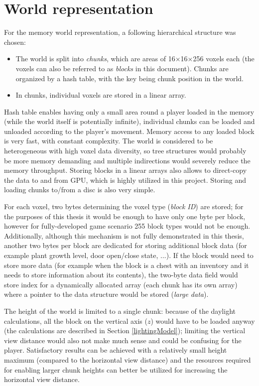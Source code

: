 \section{World representation} \label{worldRepresentationDesign}
For the memory world representation, a following hierarchical structure was chosen:
\begin{itemize}
	\item The world is split into \textit{chunks}, which are areas of 16×16×256 voxels each (the voxels can also be referred to as \textit{blocks} in this document). Chunks are organized by a hash table, with the key being chunk position in the world.
	\item In chunks, individual voxels are stored in a linear array.
\end{itemize}

Hash table enables having only a small area round a player loaded in the memory (while the world itself is potentially infinite), individual chunks can be loaded and unloaded according to the player's movement. Memory access to any loaded block is very fast, with constant complexity. The world is considered to be heterogeneous with high voxel data diversity, so tree structures would probably be more memory demanding and multiple indirections would severely reduce the memory throughput. Storing blocks in a linear arrays also allows to direct-copy the data to and from GPU, which is highly utilized in this project. Storing and loading chunks to/from a disc is also very simple.

For each voxel, two bytes determining the voxel type (\textit{block ID}) are stored; for the purposes of this thesis it would be enough to have only one byte per block, however for fully-developed game scenario 255 block types would not be enough. Additionally, although this mechanism is not fully demonstrated in this thesis, another two bytes per block are dedicated for storing additional block data (for example plant growth level, door open/close state, ...). If the block would need to store more data (for example when the block is a chest with an inventory and it needs to store information about its contents), the two-byte data field would store index for a dynamically allocated array (each chunk has its own array) where a pointer to the data structure would be stored (\textit{large data}).


The height of the world is limited to a single chunk: because of the daylight calculations, all the block on the vertical axis ($z$) would have to be loaded anyway (the calculations are described in Section \ref{lightingModel}); limiting the vertical view distance would also not make much sense and could be confusing for the player. Satisfactory results can be achieved with a relatively small height maximum (compared to the horizontal view distance) and the resources required for enabling larger chunk heights can better be utilized for increasing the horizontal view distance.

